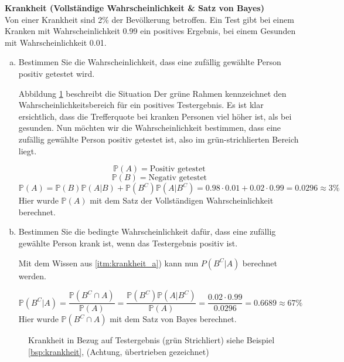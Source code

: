 {    \begin{bsp}\label{bsp:krankheit} \textbf{Krankheit (Vollständige Wahrscheinlichkeit \& Satz von Bayes)}\\

    Von einer Krankheit sind 2\% der Bevölkerung betroffen. Ein Test gibt
    bei einem Kranken mit Wahrscheinlichkeit 0.99 ein positives Ergebnis,
    bei einem Gesunden mit Wahrscheinlichkeit 0.01.

    \begin{enumerate}[a)]
        \item \label{itm:krankheit_a}Bestimmen Sie die Wahrscheinlichkeit, dass eine zufällig gewählte
            Person positiv getestet wird.

            Abbildung \ref{fig:krankheit} beschreibt die Situation Der grüne Rahmen kennzeichnet den
            Wahrscheinlichkeitsbereich für ein positives Testergebnis. Es ist klar
            ersichtlich, dass die Trefferquote bei kranken Personen viel höher ist,
            als bei gesunden. Nun möchten wir die Wahrscheinlichkeit bestimmen,
            dass eine zufällig gewählte Person positiv getestet ist, also im
            grün-strichlierten Bereich liegt.

            \[\mathbb P\left(A\right)=\text{Positiv getestet}\]
            \[\mathbb P\left(B\right)=\text{Negativ getestet}\]
            \[\mathbb P\left(A\right)=\mathbb P\left(B\right)\mathbb P\left(A|B\right)+\mathbb P\left(B^{C}\right)\mathbb P\left(A|B^{C}\right) = 0.98\cdot 0.01+0.02\cdot 0.99=0.0296\approx 3\%\]
            Hier wurde $\mathbb P(A)$ mit dem Satz der Vollständigen Wahrscheinlichkeit berechnet. 
        \item Bestimmen Sie die bedingte Wahrscheinlichkeit dafür, dass eine
            zufällig gewählte Person krank ist, wenn das Testergebnis positiv ist.

            Mit dem Wissen aus \ref{itm:krankheit_a}) kann nun  $P(B^{C}|A)$ berechnet werden.

            \[
                \mathbb P(B^{C}|A)=\frac{\mathbb P(B^{C}\cap A)}{\mathbb P\left(A\right)}=
                \frac{\mathbb P\left(B^{C}\right)\mathbb P(A|B^{C})}{\mathbb P(A)}=\frac{0.02\cdot 0.99}{0.0296}=0.6689\approx 67\%
            \]
            Hier wurde $\mathbb P\left(B^{C}\cap A\right)$ mit dem Satz von Bayes berechnet.
        \end{enumerate}
    \end{bsp}

    \begin{figure}
    \centering
        \begin{tikzpicture}
            
        \end{tikzpicture}
        \caption{Krankheit in Bezug auf Testergebnis (grün Strichliert) siehe Beispiel \ref{bsp:krankheit}, (Achtung, übertrieben gezeichnet)}
        \label{fig:krankheit}
    \end{figure}


}
